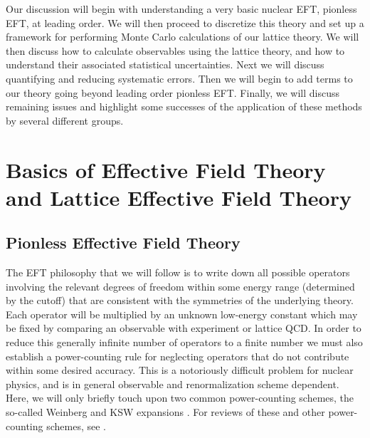 Our discussion will begin with understanding a very basic nuclear EFT, pionless EFT, at leading order. We will then proceed to discretize this theory and set up a framework for performing Monte Carlo calculations of our lattice theory. We will then discuss how to calculate observables using the lattice theory, and how to understand their associated statistical uncertainties. Next we will discuss quantifying and reducing systematic errors. Then we will begin to add terms to our theory going beyond leading order pionless EFT. Finally, we will discuss remaining issues and highlight some successes of the application of these methods by several different groups.

\section{Basics of Effective Field Theory and Lattice Effective Field Theory}
\subsection{\label{sec:EFT}Pionless Effective Field Theory}
The EFT philosophy that we will follow is to write down all possible operators involving the relevant degrees of freedom within some energy range (determined by the cutoff) that are consistent with the symmetries of the underlying theory. Each operator will be multiplied by an unknown low-energy constant which may be fixed by comparing an observable with experiment or lattice QCD. In order to reduce this generally infinite number of operators to a finite number we must also establish a power-counting rule for neglecting operators that do not contribute within some desired accuracy. This is a notoriously difficult problem for nuclear physics, and is in general observable and renormalization scheme dependent. Here, we will only briefly touch upon two common power-counting schemes, the so-called Weinberg and KSW expansions \cite{Weinberg:1990rz,Weinberg:1991um,Kaplan:1996xu,Kaplan:1998tg,Kaplan:1998we}. For reviews of these and other power-counting schemes, see \cite{Epelbaum:2008ga,Epelbaum:2010nr,Machleidt:2011zz}.

